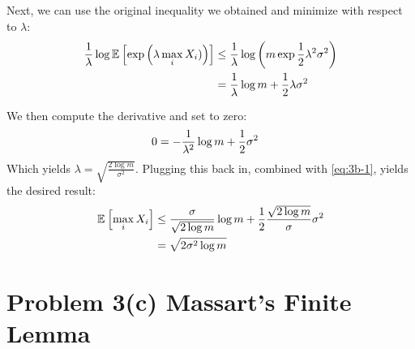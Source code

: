 \documentclass[11pt]{article}
\newcommand{\1}{\mathbb{I}} %
\begin{document}
Next, we can use the original inequality we obtained and minimize with respect to $\lambda$:
\begin{align}
	\frac{1}{\lambda} \log \mathbb{E}_{}\left[\exp\left( \lambda \max_i X_i) \right)  \right] 
		&\leq \frac{1}{\lambda} \log \left(  m \exp{\frac{1}{2}\lambda^2 \sigma^2}  \right) \\
		&= \frac{1}{\lambda} \log m + \frac{1}{2} \lambda \sigma^2 
\end{align}

We then compute the derivative and set to zero:
\begin{align}
	0 &= - \frac{1}{\lambda^2} \log m + \frac{1}{2} \sigma^2
\end{align}
Which yields $\lambda = \sqrt{\frac{2 \log m}{\sigma^2}}$. Plugging this back in, combined with \ref{eq:3b-1}, yields the desired result:
\begin{align}
	\mathbb{E}_{}\left[\max_i X_i\right] 
		&\leq \frac{\sigma}{\sqrt{2 \log m}} \log m + \frac{1}{2} \frac{\sqrt{2 \log m}}{\sigma} \sigma^2 \\
		&= \sqrt{2 \sigma^2 \log m}
\end{align}



\clearpage 
\section*{Problem 3(c) Massart's Finite Lemma}
\end{document}
